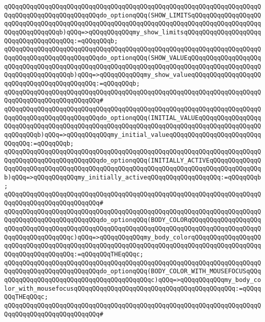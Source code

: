 \verb|qQQqqQQqqQQqqQQqqQQqqQQqqQQqqQQqqQQqqQQqqQQqqQQqqQQqqQQqqQQqqQQqqQQqqQQqqQQqqQQqqQQqqQQqqQQqqQQqdo_optionqQQq(SHOW_LIMITSqQQqqQQqqQQqqQQqqQQqqQQqqQQqqQQqqQQqqQQqqQQqqQQqqQQqqQQqqQQqqQQqqQQqqQQqqQQqqQQqqQQqqQQqqQQqqQQqqQQqqQQqb)qQQq=>qQQqqQQqqQQqmy_show_limitsqQQqqQQqqQQqqQQqqQQqqQQqqQQqqQQqqQQqqQQq:=qQQqqQQqb;|\newline
\verb|qQQqqQQqqQQqqQQqqQQqqQQqqQQqqQQqqQQqqQQqqQQqqQQqqQQqqQQqqQQqqQQqqQQqqQQqqQQqqQQqqQQqqQQqqQQqqQQqdo_optionqQQq(SHOW_VALUEqQQqqQQqqQQqqQQqqQQqqQQqqQQqqQQqqQQqqQQqqQQqqQQqqQQqqQQqqQQqqQQqqQQqqQQqqQQqqQQqqQQqqQQqqQQqqQQqqQQqqQQqqQQqb)qQQq=>qQQqqQQqqQQqmy_show_valueqQQqqQQqqQQqqQQqqQQqqQQqqQQqqQQqqQQqqQQqqQQq:=qQQqqQQqb;|\newline
\verb|qQQqqQQqqQQqqQQqqQQqqQQqqQQqqQQqqQQqqQQqqQQqqQQqqQQqqQQqqQQqqQQqqQQqqQQqqQQqqQQqqQQqqQQqqQQqqQQq#|\newline
\verb|qQQqqQQqqQQqqQQqqQQqqQQqqQQqqQQqqQQqqQQqqQQqqQQqqQQqqQQqqQQqqQQqqQQqqQQqqQQqqQQqqQQqqQQqqQQqqQQqdo_optionqQQq(INITIAL_VALUEqQQqqQQqqQQqqQQqqQQqqQQqqQQqqQQqqQQqqQQqqQQqqQQqqQQqqQQqqQQqqQQqqQQqqQQqqQQqqQQqqQQqqQQqqQQqqQQqb)qQQq=>qQQqqQQqqQQqmy_initial_valueqQQqqQQqqQQqqQQqqQQqqQQqqQQqqQQq:=qQQqqQQqb;|\newline
\verb|qQQqqQQqqQQqqQQqqQQqqQQqqQQqqQQqqQQqqQQqqQQqqQQqqQQqqQQqqQQqqQQqqQQqqQQqqQQqqQQqqQQqqQQqqQQqqQQqdo_optionqQQq(INITIALLY_ACTIVEqQQqqQQqqQQqqQQqqQQqqQQqqQQqqQQqqQQqqQQqqQQqqQQqqQQqqQQqqQQqqQQqqQQqqQQqqQQqqQQqqQQqb)qQQq=>qQQqqQQqqQQqmy_initially_activeqQQqqQQqqQQqqQQqqQQq:=qQQqqQQqb;|\newline
\verb|qQQqqQQqqQQqqQQqqQQqqQQqqQQqqQQqqQQqqQQqqQQqqQQqqQQqqQQqqQQqqQQqqQQqqQQqqQQqqQQqqQQqqQQqqQQqqQQq#|\newline
\verb|qQQqqQQqqQQqqQQqqQQqqQQqqQQqqQQqqQQqqQQqqQQqqQQqqQQqqQQqqQQqqQQqqQQqqQQqqQQqqQQqqQQqqQQqqQQqqQQqdo_optionqQQq(BODY_COLORqQQqqQQqqQQqqQQqqQQqqQQqqQQqqQQqqQQqqQQqqQQqqQQqqQQqqQQqqQQqqQQqqQQqqQQqqQQqqQQqqQQqqQQqqQQqqQQqqQQqqQQqqQQqc)qQQq=>qQQqqQQqqQQqmy_body_colorqQQqqQQqqQQqqQQqqQQqqQQqqQQqqQQqqQQqqQQqqQQqqQQqqQQqqQQqqQQqqQQqqQQqqQQqqQQqqQQqqQQqqQQqqQQqqQQqqQQqqQQqqQQq:=qQQqqQQqTHEqQQqc;|\newline
\verb|qQQqqQQqqQQqqQQqqQQqqQQqqQQqqQQqqQQqqQQqqQQqqQQqqQQqqQQqqQQqqQQqqQQqqQQqqQQqqQQqqQQqqQQqqQQqqQQqdo_optionqQQq(BODY_COLOR_WITH_MOUSEFOCUSqQQqqQQqqQQqqQQqqQQqqQQqqQQqqQQqqQQqqQQqqQQqc)qQQq=>qQQqqQQqqQQqmy_body_color_with_mousefocusqQQqqQQqqQQqqQQqqQQqqQQqqQQqqQQqqQQqqQQqqQQq:=qQQqqQQqTHEqQQqc;|\newline
\verb|qQQqqQQqqQQqqQQqqQQqqQQqqQQqqQQqqQQqqQQqqQQqqQQqqQQqqQQqqQQqqQQqqQQqqQQqqQQqqQQqqQQqqQQqqQQqqQQq#|\newline
